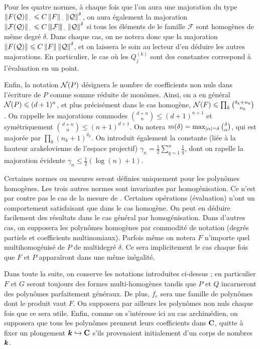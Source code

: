 Pour les quatre normes, à chaque fois que l'on aura une majoration du type $\left\lVert F(\mathcal Q)\right\rVert_{\,\cdot\,} \leqslant C \left\lVert F\right\rVert _{\,\cdot\,} \left\lVert\mathcal Q\right\rVert_{\,\cdot\,}^\delta$, on aura également la majoration $\left\lVert\mathcal F(\mathcal Q)\right\rVert_{\,\cdot\,} \leqslant C \left\lvert\hspace{-1pt}\left\lvert\hspace{-1pt} \left\lvert\mathcal F\right\rvert \hspace{-1pt}\right\rvert\hspace{-1pt}\right\rvert_{\,\cdot\,} \left\lVert\mathcal Q\right\rVert^\delta$ si tous les éléments de le famille $\mathcal F$ sont homogènes de même degré $\delta$. Dans chaque cas, on ne notera donc que la majoration $\left\lVert F(\mathcal Q)\right\rVert \leqslant C \left\lVert F\right\rVert \left\lVert\mathcal Q\right\rVert^\delta$, et on laissera le soin au lecteur d'en déduire les autres majorations. En particulier, le cas où les $Q_j^{(k)}$ sont des constantes correspond à l'évaluation en un point.

Enfin, la notation $\mathcal N(P)$ désignera le nombre de coefficients non nuls
dans l'écriture de $P$ comme somme réduite de monômes. Ainsi, on a en général
$\mathcal N(P) \leqslant (d+1)^n$, et plus précisément dans le cas homogène, $\mathcal N(F)
\leqslant \prod\nolimits_k \binom{\delta_k + n_k}{n_k}$. On rappelle les majorations
commodes $\binom{d + n}{n} \le (d + 1)^{n+1}$ et symétriquement $\binom{d +
  n}{n} \le (n + 1)^{d+1}$. On notera $m(\delta) = \max_{\left\lvert\alpha\right\rvert = \delta}
{\textstyle \binom\delta\alpha} $, qui est majorée par $\prod\nolimits_k (n_k
+ 1)^{\delta_k}$. On introduit également la constante (liée à la hauteur
arakelovienne de l'espace projectif) $\gamma_n = \frac12 \sum_{q=1}^{n}
\frac1q$, dont on rapelle la majoration évidente $\gamma_n \le \frac12
(\log(n) + 1)$.

Certaines normes ou mesures seront définies uniquement pour les polynômes
homogènes. Les trois autres normes sont invariantes par homogénisation. Ce
n'est par contre  pas le cas de la mesure de .
Certaines opérations (évaluation) n'ont un comportement satisfaisant que dans
le cas homogène. On peut en déduire facilement des résultats dans le cas
général par homogénisation. Dans d'autres cas, on supposera les polynômes
homogènes par commodité de notation (degrés partiels et coefficients
multinomiaux). Parfois même on notera $F$ n'importe quel multihomogénisé de
$P$ de multidegré $\delta$. Ce sera implicitement le cas chaque fois que $F$
et $P$ apparaîront dans une même inégalité.

Dans toute la suite, on conserve les notations introduites ci-dessus ; en
particulier $F$ et $G$ seront toujours des formes multi-homogènes tandis que
$P$ et $Q$ incarneront des polynômes parfaitement généraux. De plus, $f_e$
sera une famille de polynômes dont le produit vaut $F$. On supposera par
ailleurs les polynômes non nuls chaque fois que ce sera utile. Enfin, comme on
s'intéresse ici au cas archimédien, on supposera que tous les polynômes
prennent leurs coefficients dans $\mathbf{C}$, quitte à fixer un plongement $\boldsymbol{k}
\hookrightarrow \mathbf{C}$ s'ils provenaient initialement d'un corps de nombres
$\boldsymbol{k}$.

